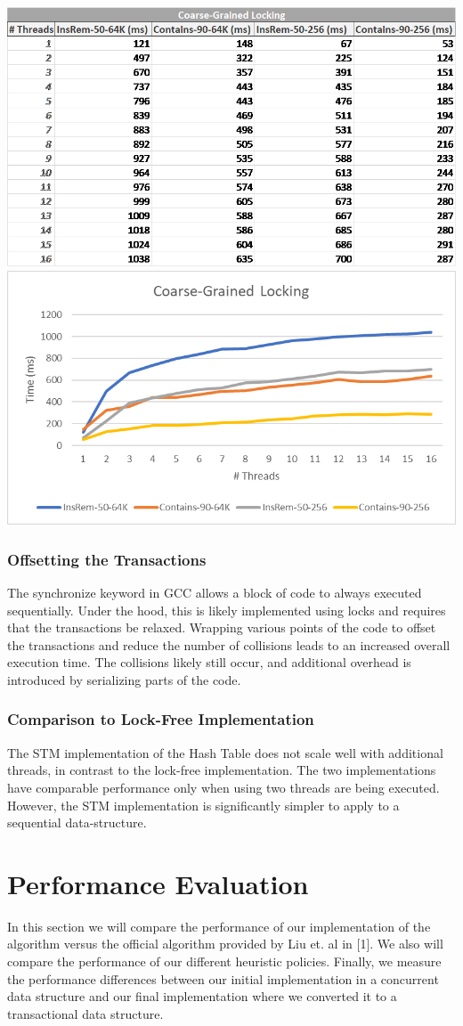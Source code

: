 \documentclass[11pt]{article} %
\begin{document}
\bigskip
\includegraphics[width=0.5\linewidth]{Table5.png}
\includegraphics[width=0.5\linewidth]{Graph5.png}

\subsubsection{Offsetting the Transactions}

The synchronize keyword in GCC allows a block of code to always executed sequentially. Under the hood, this is likely implemented using locks and requires that the transactions be relaxed. Wrapping various points of the code to offset the transactions and reduce the number of collisions leads to an increased overall execution time. The collisions likely still occur, and additional overhead is introduced by serializing parts of the code.

\subsubsection{Comparison to Lock-Free Implementation}

The STM implementation of the Hash Table does not scale well with additional threads, in contrast to the lock-free implementation. The two implementations have comparable performance only when using two threads are being executed. However, the STM implementation is significantly simpler to apply to a sequential data-structure.

\section{Performance Evaluation}

In this section we will compare the performance of our implementation of the algorithm versus the official algorithm provided by Liu et. al in [1]. We also will compare the performance of our different heuristic policies. Finally, we measure the performance differences between our initial implementation in a concurrent data structure and our final implementation where we converted it to a transactional data structure.
\end{document}
